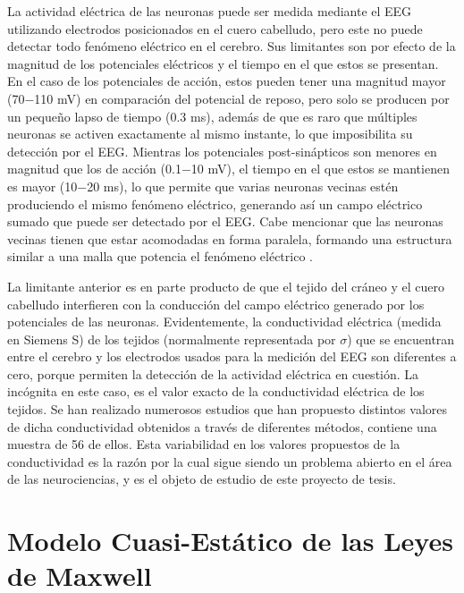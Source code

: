 La actividad eléctrica de las neuronas puede ser medida mediante el EEG utilizando electrodos posicionados en el cuero cabelludo, pero este no puede detectar todo fenómeno eléctrico en el cerebro.
Sus limitantes son por efecto de la magnitud de los potenciales eléctricos y el tiempo en el que estos se presentan.
En el caso de los potenciales de acción, estos pueden tener una magnitud mayor (70$-$110 mV) en comparación del potencial de reposo, pero solo se producen por un pequeño lapso de tiempo (0.3 ms), además de que es raro que múltiples neuronas se activen exactamente al mismo instante, lo que imposibilita su detección por el EEG.
Mientras los potenciales post-sinápticos son menores en magnitud que los de acción (0.1$-$10 mV), el tiempo en el que estos se mantienen es mayor (10$-$20 ms), lo que permite que varias neuronas vecinas estén produciendo el mismo fenómeno eléctrico, generando así un campo eléctrico sumado que puede ser detectado por el EEG.
Cabe mencionar que las neuronas vecinas tienen que estar acomodadas en forma paralela, formando una estructura similar a una malla que potencia el fenómeno eléctrico \cite{nichollsNeuronBrain2012, Hallez2007}.

La limitante anterior es en parte producto de que el tejido del cráneo y el cuero cabelludo interfieren con la conducción del campo eléctrico generado por los potenciales de las neuronas.
Evidentemente, la conductividad eléctrica (medida en Siemens S) de los tejidos (normalmente representada por $\sigma$) que se encuentran entre el cerebro y los electrodos usados para la medición del EEG son diferentes a cero, porque permiten la detección de la actividad eléctrica en cuestión. 
La incógnita en este caso, es el valor exacto de la conductividad eléctrica de los tejidos.
Se han realizado numerosos estudios que han propuesto distintos valores de dicha conductividad obtenidos a través de diferentes métodos, \cite{McCann2019} contiene una muestra de 56 de ellos. 
Esta variabilidad en los valores propuestos de la conductividad es la razón por la cual sigue siendo un problema abierto en el área de las neurociencias, y es el objeto de estudio de este proyecto de tesis.

\section{Modelo Cuasi-Estático de las Leyes de Maxwell}
\label{sec:intro:physics}

